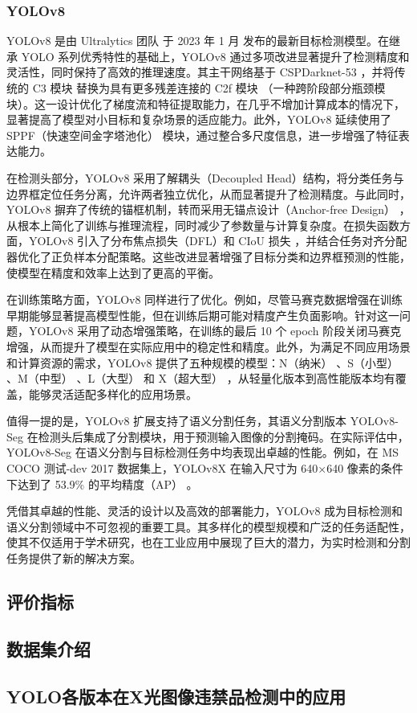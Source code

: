 \documentclass[11pt,twocolumn]{ctexart}
\begin{document}
\subsubsection{YOLOv8}
YOLOv8\cite{yolov8} 是由 Ultralytics 团队 于 2023 年 1 月 发布的最新目标检测模型。在继承 YOLO 系列优秀特性的基础上，YOLOv8 通过多项改进显著提升了检测精度和灵活性，同时保持了高效的推理速度。其主干网络基于 CSPDarknet-53 ，并将传统的 C3 模块 替换为具有更多残差连接的 C2f 模块 （一种跨阶段部分瓶颈模块）。这一设计优化了梯度流和特征提取能力，在几乎不增加计算成本的情况下，显著提高了模型对小目标和复杂场景的适应能力。此外，YOLOv8 延续使用了 SPPF（快速空间金字塔池化） 模块，通过整合多尺度信息，进一步增强了特征表达能力。

在检测头部分，YOLOv8 采用了解耦头（Decoupled Head）结构，将分类任务与边界框定位任务分离，允许两者独立优化，从而显著提升了检测精度。与此同时，YOLOv8 摒弃了传统的锚框机制，转而采用无锚点设计（Anchor-free Design） ，从根本上简化了训练与推理流程，同时减少了参数量与计算复杂度。在损失函数方面，YOLOv8 引入了分布焦点损失（DFL）和 CIoU 损失 ，并结合任务对齐分配器优化了正负样本分配策略。这些改进显著增强了目标分类和边界框预测的性能，使模型在精度和效率上达到了更高的平衡。

在训练策略方面，YOLOv8 同样进行了优化。例如，尽管马赛克数据增强在训练早期能够显著提高模型性能，但在训练后期可能对精度产生负面影响。针对这一问题，YOLOv8 采用了动态增强策略，在训练的最后 10 个 epoch 阶段关闭马赛克增强，从而提升了模型在实际应用中的稳定性和精度。此外，为满足不同应用场景和计算资源的需求，YOLOv8 提供了五种规模的模型：N（纳米） 、S（小型） 、M（中型） 、L（大型） 和 X（超大型） ，从轻量化版本到高性能版本均有覆盖，能够灵活适配多样化的应用场景。

值得一提的是，YOLOv8 扩展支持了语义分割任务，其语义分割版本 YOLOv8-Seg 在检测头后集成了分割模块，用于预测输入图像的分割掩码。在实际评估中，YOLOv8-Seg 在语义分割与目标检测任务中均表现出卓越的性能。例如，在 MS COCO 测试-dev 2017 数据集上，YOLOv8X 在输入尺寸为 640×640 像素的条件下达到了 53.9\% 的平均精度（AP） 。

凭借其卓越的性能、灵活的设计以及高效的部署能力，YOLOv8 成为目标检测和语义分割领域中不可忽视的重要工具。其多样化的模型规模和广泛的任务适配性，使其不仅适用于学术研究，也在工业应用中展现了巨大的潜力，为实时检测和分割任务提供了新的解决方案。


\subsection{评价指标}
\subsection{数据集介绍}
\subsection{YOLO各版本在X光图像违禁品检测中的应用}





\end{document}
